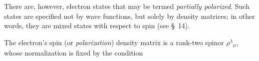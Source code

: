 There are, however, electron states that may be termed
\emph{partially polarized}. Such states are specified not by wave
functions, but solely by density matrices; in other words, they are mixed
states with respect to spin (see \S~14).

The electron's spin (or \emph{polarization}) density matrix is a rank-two
spinor $\rho^\lambda{}_\mu$, whose normalization is fixed by the condition
